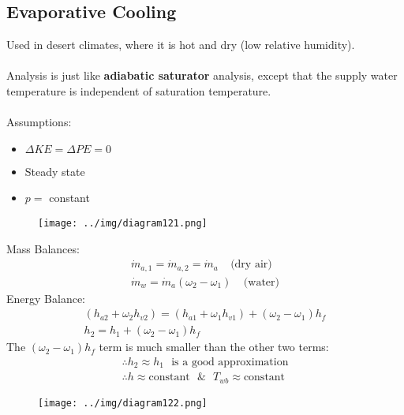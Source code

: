 \documentclass[class=report, crop=false, 12pt,a4paper]{standalone}
\numberwithin{equation}{section}
\begin{document}
\subsection{Evaporative Cooling}
Used in desert climates, where it is hot and dry (low relative humidity). \\\\
Analysis is just like \textbf{adiabatic saturator} analysis, except that the supply water temperature is independent of saturation temperature. \\\\
Assumptions:
\begin{itemize}[noitemsep]
  \item $\Delta KE = \Delta PE = 0$
  \item Steady state
  \item $p =$ constant
\end{itemize}
\begin{figure}[H]
  \centering
  \texttt{[image: ../img/diagram121.png]}
  \caption{}
\end{figure}
Mass Balances:
\begin{gather}
  \dot{m}_{a,1} = \dot{m}_{a,2} = \dot{m}_{a} \ \ \ \ \ \text{(dry air)} \\[5pt]
  \dot{m}_{w} = \dot{m}_{a}(\omega_2-\omega_1) \ \ \ \ \ \text{(water)}
\end{gather}
Energy Balance:
\begin{gather}
  (h_{a2} + \omega_2h_{v2}) = (h_{a1} + \omega_1h_{v1}) + (\omega_2-\omega_1)h_{f} \\[5pt]
  h_2 = h_1 + (\omega_2-\omega_1)h_f
\end{gather}
The $(\omega_2-\omega_1)h_f$ term is much smaller than the other two terms:
\begin{gather}
  \therefore h_2 \approx h_1 \ \ \ \text{is a good approximation} \\[5pt]
  \therefore h \approx \text{constant} \ \ \ \& \ \ \ T_{wb} \approx \text{constant}
\end{gather}
\begin{figure}[H]
  \centering
  \texttt{[image: ../img/diagram122.png]}
  \caption{}
\end{figure}
\end{document}
